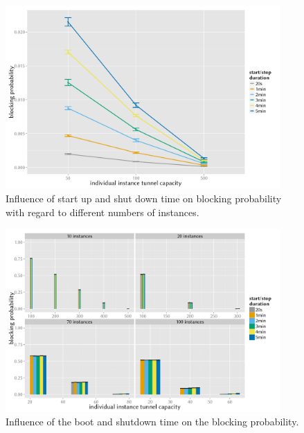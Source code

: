 \documentclass{beamer}
\begin{document}
\begin{frame}
	\frametitle{}
	\begin{figure}
		\includegraphics[height=7cm]{../../chapters/04-mobilenets/images/compare-maxinstances-block.pdf}
		\caption{Influence of start up and shut down time on blocking probability with regard to different numbers of instances.}
	\end{figure}
\end{frame}

\begin{frame}
	\begin{figure}
		\includegraphics[height=7cm]{../../chapters/04-mobilenets/images/R-virtualized-startstop-blocking-barchart.pdf}
		\caption{Influence of the boot and shutdown time on the blocking probability.}
	\end{figure}
\end{frame}
\end{document}
